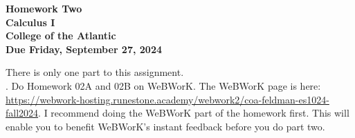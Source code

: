 \documentclass[12pt]{article}
\begin{document}
\pagestyle{empty}
 
\begin{center}
{\LARGE {\bf Homework Two}}\\
\bigskip
{\Large {\bf Calculus I}}\\
\bigskip
{\Large {\bf College of the Atlantic}}\\
\bigskip
{ {\bf Due Friday, September 27, 2024}}\\ 
\end{center}
\medskip


\noindent There is only one part to this assignment.\\

.  Do Homework 02A and 02B on
WeBWorK. The WeBWorK page is here: \url{https://webwork-hosting.runestone.academy/webwork2/coa-feldman-es1024-fall2024}.
I recommend doing the WeBWorK part of the homework first.  This will
enable you to benefit WeBWorK's instant feedback before you do part
two.\\ 
\end{document}
